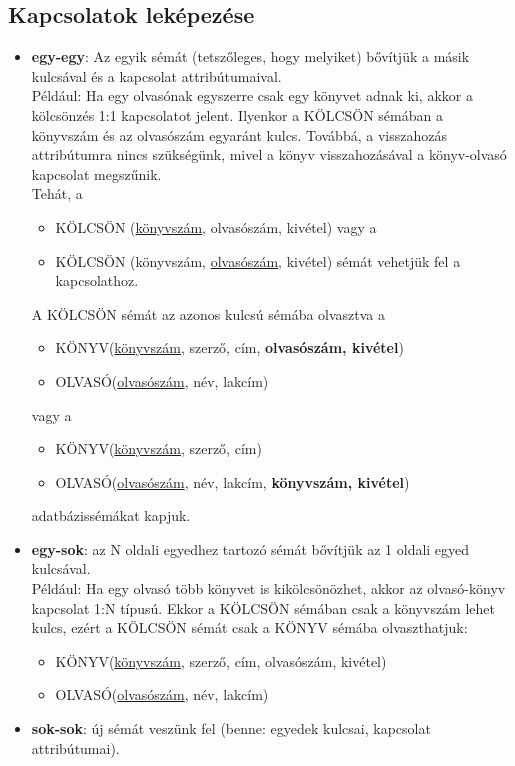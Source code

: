 \documentclass[tikz,12pt,margin=0px]{article}
\begin{document}
	\subsection*{Kapcsolatok leképezése}
	\begin{itemize}
        \item \textbf{egy-egy}: Az egyik sémát (tetszőleges, hogy melyiket) bővítjük a másik kulcsával és a kapcsolat attribútumaival.\\

        Például: Ha egy olvasónak egyszerre csak egy könyvet adnak ki, akkor a kölcsönzés 1:1 kapcsolatot jelent. Ilyenkor a KÖLCSÖN sémában a könyvszám és az olvasószám egyaránt kulcs. Továbbá, a visszahozás attribútumra nincs szükségünk, mivel a könyv visszahozásával a könyv-olvasó kapcsolat megszűnik.\\

        Tehát, a
        \begin{itemize}
        \item {\small KÖLCSÖN (\underline{könyvszám}, olvasószám, kivétel)} vagy a
        \item {\small KÖLCSÖN (könyvszám, \underline{olvasószám}, kivétel)} sémát vehetjük fel a kapcsolathoz.\\
        \end{itemize}

        A KÖLCSÖN sémát az azonos kulcsú sémába olvasztva a
        {\small
        \begin{itemize}
            \item KÖNYV(\underline{könyvszám}, szerző, cím, \textbf{olvasószám, kivétel})
            \item OLVASÓ(\underline{olvasószám}, név, lakcím)
        \end{itemize}
        } vagy a
        {\small
        \begin{itemize}
            \item KÖNYV(\underline{könyvszám}, szerző, cím)
            \item OLVASÓ(\underline{olvasószám}, név, lakcím, \textbf{könyvszám, kivétel})
        \end{itemize}
        }
        adatbázissémákat kapjuk.
        \item \textbf{egy-sok}: az N oldali egyedhez tartozó sémát bővítjük az 1 oldali egyed kulcsával.\\

        Például: Ha egy olvasó több könyvet is kikölcsönözhet, akkor az olvasó-könyv kapcsolat 1:N típusú. Ekkor a KÖLCSÖN sémában csak a könyvszám lehet kulcs, ezért a KÖLCSÖN sémát csak a KÖNYV sémába olvaszthatjuk:
        {\small
        \begin{itemize}
            \item KÖNYV(\underline{könyvszám}, szerző, cím, olvasószám, kivétel)
            \item OLVASÓ(\underline{olvasószám}, név, lakcím)
        \end{itemize}
        }
        \item \textbf{sok-sok}: új sémát veszünk fel (benne: egyedek kulcsai, kapcsolat attribútumai).\\


\end{itemize}
\end{document}
